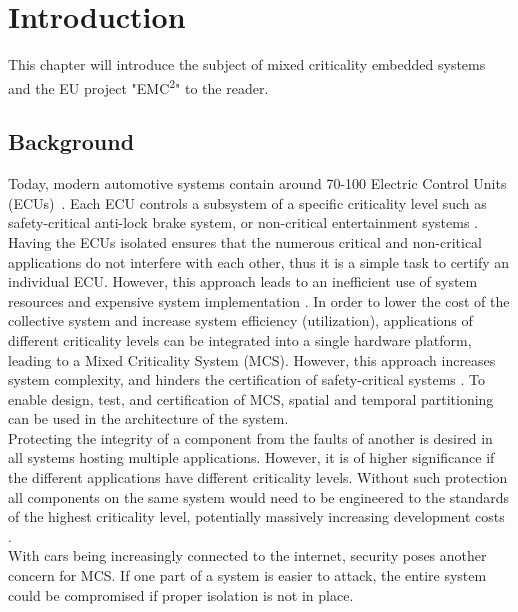 \chapter{Introduction}
\label{sec:introduction}
This chapter will introduce the subject of mixed criticality embedded systems and the EU project "EMC\textsuperscript{2}" to the reader.

\section{Background}
Today, modern automotive systems contain around 70-100 Electric Control Units (ECUs)~\cite{lemke2012}. Each ECU controls a subsystem of a specific criticality level such as safety-critical anti-lock brake system, or non-critical entertainment systems \cite{weber2015}. Having the ECUs isolated ensures that the numerous critical and non-critical applications do not interfere with each other, thus it is a simple task to certify an individual ECU. However, this approach leads to an inefficient use of system resources and expensive system implementation \cite{burns2016}. In order to lower the cost of the collective system and increase system efficiency (utilization), applications of different criticality levels can be integrated into a single hardware platform, leading to a Mixed Criticality System (MCS). However, this approach increases system complexity, and hinders the certification of safety-critical systems \cite{zaki2016}. To enable design, test, and certification of MCS, spatial and temporal partitioning can be used in the architecture of the system.\\

Protecting the integrity of a component from the faults of another is desired in all systems hosting multiple applications. However, it is of higher significance if the different applications have different criticality levels. Without such protection all components on the same system would need to be engineered to the standards of the highest criticality level, potentially massively increasing development costs \cite{burns2016}.\\

With cars being increasingly connected to the internet, security poses another concern for MCS. If one part of a system is easier to attack, the entire system could be compromised if proper isolation is not in place.\\

